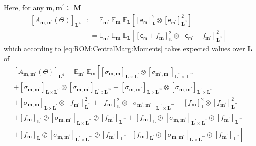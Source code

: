 \documentclass[preprint,12pt]{elsarticle}
\newcommand*{\M}[1]{\ensuremath{#1}\xspace}
\newcommand*{\x}{\times}
\newcommand*{\mi}[1]{\mathbf{#1}}
\newcommand*{\rv}[1]{\mathsf{#1}}
\newcommand*{\te}[2][]{\left\lbrack{#2}\right\rbrack_{#1}}
\newcommand*{\deq}{\M{\mathrel{\mathop:}=}}
\newcommand*{\ev}[3][]{\mathbb{E}_{#3}^{#1}\!\left\lbrack{#2}\right\rbrack}
\newcommand*{\evt}[3][]{\mathbb{E}_{#3}^{#1}\!#2}
\begin{document}
            Here, for any $\mi{m},\mi{m^{\prime}}\subseteq\mi{M}$
            \begin{equation*}
                \begin{aligned}
                    \te[\mi{L^4}]{A_{\mi{m},\mi{m^{\prime}}}(\Theta)}
                    &\deq \evt{\;\evt{\;\ev{\te[\mi{L}]{\rv{e_{m}}}^{2} \otimes \te[\mi{L^{\prime\prime}}]{\rv{e_{m^{\prime}}}}^{2}}{\mi{L}}}{\mi{m}}}{\mi{m^{\prime}}} \\
                    &\phantom{:}= \evt{\;\evt{\;\ev{\te[\mi{L}]{\rv{c_{m}}+f_{\mi{m}}}^{2} \otimes \te[\mi{L^{\prime\prime}}]{\rv{c_{m^{\prime}}}+ f_{\mi{m^{\prime}}}}^{2}}{\mi{L}}}{\mi{m}}}{\mi{m^{\prime}}}  
                \end{aligned}
            \end{equation*}
            which according to \cref{eq:ROM:CentralMarg:Moments} takes expected values over $\mi{L}$ of
            \begin{multline*}
                \te[\mi{L^4}]{A_{\mi{m},\mi{m^{\prime}}}(\Theta)} 
                = \evt{\;\evt{\left\lbrack
                \te[\mi{L\x L^{\prime}}]{\sigma_{\mi{m,m}}} \otimes \te[\mi{L^{\prime\prime}\x L^{\prime\prime\prime}}]{\sigma_{\mi{m^{\prime},m^{\prime}}}}\right. \\
                +\te[\mi{L\x L^{\prime\prime}}]{\sigma_{\mi{m,m^{\prime}}}} \otimes \te[\mi{L^{\prime}\x L^{\prime\prime\prime}}]{\sigma_{\mi{m,m^{\prime}}}}
                +\te[\mi{L\x L^{\prime\prime\prime}}]{\sigma_{\mi{m,m^{\prime}}}} \otimes \te[\mi{L^{\prime}\x L^{\prime\prime}}]{\sigma_{\mi{m,m^{\prime}}}} \\
                + \te[\mi{L\x L^{\prime}}]{\sigma_{\mi{m,m}}} \otimes \te[\mi{L^{\prime\prime}}]{f_{\mi{m^{\prime}}}}^{2} 
                + \te[\mi{L}]{f_{\mi{m}}}^{2} \otimes \te[\mi{L^{\prime\prime}\x L^{\prime\prime\prime}}]{\sigma_{\mi{m^{\prime},m^{\prime}}}}
                + \te[\mi{L}]{f_{\mi{m}}}^{2} \otimes \te[\mi{L^{\prime\prime}}]{f_{\mi{m^{\prime}}}}^{2} \\
                +\te[\mi{L^{\prime}}]{f_{\mi{m}}} \oslash \te[\mi{L\x L^{\prime\prime}}]{\sigma_{\mi{m,m^{\prime}}}} \oslash \te[\mi{L^{\prime\prime\prime}}]{f_{\mi{m^{\prime}}}}
                +\te[\mi{L}]{f_{\mi{m}}} \oslash \te[\mi{L^{\prime}\x L^{\prime\prime}}]{\sigma_{\mi{m,m^{\prime}}}} \oslash \te[\mi{L^{\prime\prime\prime}}]{f_{\mi{m^{\prime}}}}\\
                +\te[\mi{L}]{f_{\mi{m}}} \oslash \te[\mi{L^{\prime}\x L^{\prime\prime\prime}}]{\sigma_{\mi{m,m^{\prime}}}} \oslash \te[\mi{L^{\prime\prime}}]{f_{\mi{m^{\prime}}}}
                \left. +\te[\mi{L^{\prime}}]{f_{\mi{m}}} \oslash \te[\mi{L\x L^{\prime\prime\prime}}]{\sigma_{\mi{m,m^{\prime}}}} \oslash \te[\mi{L^{\prime\prime}}]{f_{\mi{m^{\prime}}}}
                \right\rbrack}{\mi{m}}}{\mi{m^{\prime}}} 
            \end{multline*}
\end{document}
